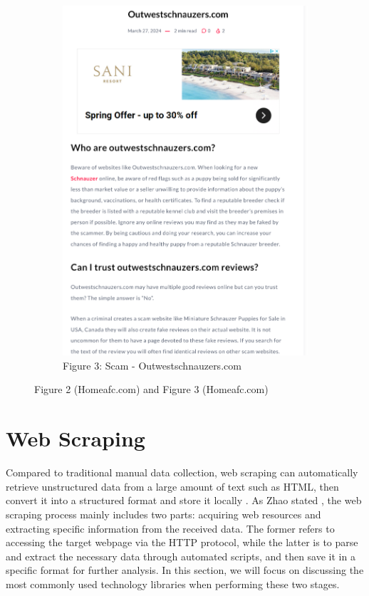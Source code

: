 \documentclass[ oneside,%
                    author={Cassie Qing Tang},
                    degree={BSc},
                     title={An Automated Response System for Disrupting Online Pet Scamming \\ },
                    subtitle={ }]{dissertation}
\begin{document}
\begin{figure}[!htb]
\begin{subfigure}[b]{0.45\textwidth}
        \includegraphics[width=\linewidth]{pic/figure3.png}
        \caption{Figure 3: Scam - Outwestschnauzers.com}
        \label{fig:sub3}
    \end{subfigure}
    \caption{Figure 2 (Homeafc.com) and Figure 3 (Homeafc.com)}
    \label{fig:main2}
\end{figure}


\section{Web Scraping}
Compared to traditional manual data collection, web scraping can automatically retrieve unstructured data from a large amount of text such as HTML, then convert it into a structured format and store it locally \cite{khder_web_2021}. As Zhao stated \cite{zhao_web_2017}, the web scraping process mainly includes two parts: acquiring web resources and extracting specific information from the received data. The former refers to accessing the target webpage via the HTTP protocol, while the latter is to parse and extract the necessary data through automated scripts, and then save it in a specific format for further analysis. In this section, we will focus on discussing the most commonly used technology libraries when performing these two stages.
\\
\end{document}
